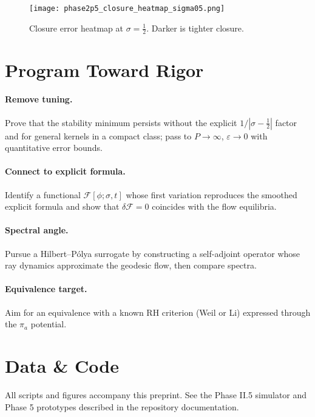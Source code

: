 \documentclass[11pt]{article}
\begin{document}
\begin{figure}[h!]
  \centering
  \texttt{[image: phase2p5\_closure\_heatmap\_sigma05.png]}
  \caption{Closure error heatmap at $\sigma=\tfrac12$. Darker is tighter closure.}
  \label{fig:heatmap}
\end{figure}

\section{Program Toward Rigor}
\paragraph{Remove tuning.} Prove that the stability minimum persists without the explicit $1/|\sigma-\tfrac12|$ factor and for general kernels in a compact class; pass to $P\to\infty$, $\varepsilon\to 0$ with quantitative error bounds.
\paragraph{Connect to explicit formula.} Identify a functional $\mathcal{F}[\phi;\sigma,t]$ whose first variation reproduces the smoothed explicit formula and show that $\delta \mathcal{F}=0$ coincides with the flow equilibria.
\paragraph{Spectral angle.} Pursue a Hilbert--Pólya surrogate by constructing a self-adjoint operator whose ray dynamics approximate the geodesic flow, then compare spectra.
\paragraph{Equivalence target.} Aim for an equivalence with a known RH criterion (Weil or Li) expressed through the $\pi_a$ potential.

\section*{Data \& Code}
All scripts and figures accompany this preprint. See the Phase II.5 simulator and Phase 5 prototypes described in the repository documentation.
\end{document}

